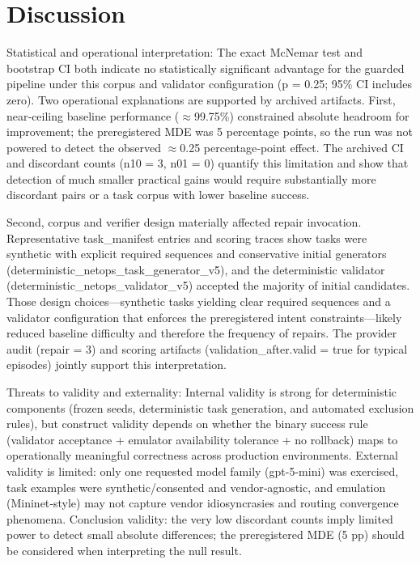 \documentclass[conference]{IEEEtran}
\begin{document}
\section{Discussion}
Statistical and operational interpretation: The exact McNemar test and bootstrap CI both indicate no statistically significant advantage for the guarded pipeline under this corpus and validator configuration (p = 0.25; 95\% CI includes zero). Two operational explanations are supported by archived artifacts. First, near‑ceiling baseline performance (\ensuremath{\approx}99.75\%) constrained absolute headroom for improvement; the preregistered MDE was 5 percentage points, so the run was not powered to detect the observed \ensuremath{\approx}0.25 percentage‑point effect. The archived CI and discordant counts (n10 = 3, n01 = 0) quantify this limitation and show that detection of much smaller practical gains would require substantially more discordant pairs or a task corpus with lower baseline success.

Second, corpus and verifier design materially affected repair invocation. Representative task\_manifest entries and scoring traces show tasks were synthetic with explicit required sequences and conservative initial generators (deterministic\_netops\_task\_generator\_v5), and the deterministic validator (deterministic\_netops\_validator\_v5) accepted the majority of initial candidates. Those design choices---synthetic tasks yielding clear required sequences and a validator configuration that enforces the preregistered intent constraints---likely reduced baseline difficulty and therefore the frequency of repairs. The provider audit (repair = 3) and scoring artifacts (validation\_after.valid = true for typical episodes) jointly support this interpretation.

Threats to validity and externality: Internal validity is strong for deterministic components (frozen seeds, deterministic task generation, and automated exclusion rules), but construct validity depends on whether the binary success rule (validator acceptance + emulator availability tolerance + no rollback) maps to operationally meaningful correctness across production environments. External validity is limited: only one requested model family (gpt-5-mini) was exercised, task examples were synthetic/consented and vendor‑agnostic, and emulation (Mininet‑style) may not capture vendor idiosyncrasies and routing convergence phenomena. Conclusion validity: the very low discordant counts imply limited power to detect small absolute differences; the preregistered MDE (5 pp) should be considered when interpreting the null result.
\end{document}
